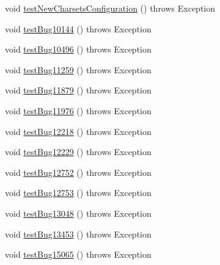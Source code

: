 \begin{DoxyCompactItemize}
\item 
void \mbox{\hyperlink{classtestsuite_1_1regression_1_1_connection_regression_test_a3e4f6c5f1867be7b76a82e9c0344cc5c}{test\+New\+Charsets\+Configuration}} ()  throws Exception 
\item 
void \mbox{\hyperlink{classtestsuite_1_1regression_1_1_connection_regression_test_aff36d0acf4519875786c945621230acb}{test\+Bug10144}} ()  throws Exception 
\item 
void \mbox{\hyperlink{classtestsuite_1_1regression_1_1_connection_regression_test_a1a46119260190c85a4b8e8acbe3e9279}{test\+Bug10496}} ()  throws Exception 
\item 
void \mbox{\hyperlink{classtestsuite_1_1regression_1_1_connection_regression_test_a94685739a49f2d73ca811c65317b2db8}{test\+Bug11259}} ()  throws Exception 
\item 
void \mbox{\hyperlink{classtestsuite_1_1regression_1_1_connection_regression_test_aa63c56bf945c18c91d9f4486fdb6ab67}{test\+Bug11879}} ()  throws Exception 
\item 
void \mbox{\hyperlink{classtestsuite_1_1regression_1_1_connection_regression_test_a9c63a889bf88b7f4ec84d455614d8da0}{test\+Bug11976}} ()  throws Exception 
\item 
void \mbox{\hyperlink{classtestsuite_1_1regression_1_1_connection_regression_test_add3171d1526d38f6597d2bd384d44cf0}{test\+Bug12218}} ()  throws Exception 
\item 
void \mbox{\hyperlink{classtestsuite_1_1regression_1_1_connection_regression_test_ae7bb792ec6285364876e5c6c1fe03c9e}{test\+Bug12229}} ()  throws Exception 
\item 
void \mbox{\hyperlink{classtestsuite_1_1regression_1_1_connection_regression_test_a835b955e0018a43040f38a7dff684e0c}{test\+Bug12752}} ()  throws Exception 
\item 
void \mbox{\hyperlink{classtestsuite_1_1regression_1_1_connection_regression_test_a16ab33fe936fd5b6fd19d3c284df8f59}{test\+Bug12753}} ()  throws Exception 
\item 
void \mbox{\hyperlink{classtestsuite_1_1regression_1_1_connection_regression_test_a4a84b1ea9f0518f341a3588f6c999033}{test\+Bug13048}} ()  throws Exception 
\item 
void \mbox{\hyperlink{classtestsuite_1_1regression_1_1_connection_regression_test_af142c9614c193db02b2b9856d109b2ec}{test\+Bug13453}} ()  throws Exception 
\item 
void \mbox{\hyperlink{classtestsuite_1_1regression_1_1_connection_regression_test_a35b61648054c98948b1f82e6b078c9b7}{test\+Bug15065}} ()  throws Exception 

\end{DoxyCompactItemize}
